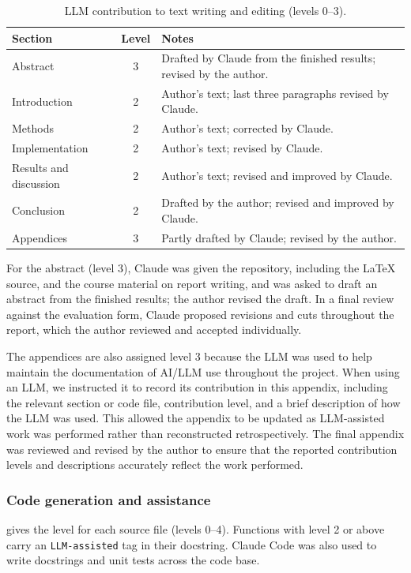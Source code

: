 \begin{table}[htbp]
    \centering
    \caption{LLM contribution to text writing and editing (levels 0--3).}
    \label{tab:llm-writing-contribution}
    {\footnotesize
    \begin{tabularx}{\columnwidth}{@{}lcX@{}}
        \toprule
        \textbf{Section} & \textbf{Level} & \textbf{Notes} \\
        \midrule
        Abstract & 3 & Drafted by Claude from the finished results; revised by the author. \\
        Introduction & 2 & Author's text; last three paragraphs revised by Claude. \\
        Methods & 2 & Author's text; corrected by Claude. \\
        Implementation & 2 & Author's text; revised by Claude. \\
        Results and discussion & 2 & Author's text; revised and improved by Claude. \\
        Conclusion & 2 & Drafted by the author; revised and improved by Claude. \\
        Appendices & 3 & Partly drafted by Claude; revised by the author. \\
        \bottomrule
    \end{tabularx}}
\end{table}

For the abstract (level 3), Claude was given the repository, including the
\LaTeX{} source, and the course material on report writing, and was asked to
draft an abstract from the finished results; the author revised the draft. In a
final review against the evaluation form, Claude proposed revisions and cuts
throughout the report, which the author reviewed and accepted individually.

The appendices are also assigned level 3 because the LLM was used to help
maintain the documentation of AI/LLM use throughout the project. When using an
LLM, we instructed it to record its contribution in this appendix, including
the relevant section or code file, contribution level, and a brief description
of how the LLM was used. This allowed the appendix to be updated as LLM-assisted
work was performed rather than reconstructed retrospectively. The final appendix
was reviewed and revised by the author to ensure that the reported contribution
levels and descriptions accurately reflect the work performed.

\subsubsection{Code generation and assistance}
 gives the level for each source file (levels 0--4).
Functions with level 2 or above carry an \texttt{LLM-assisted} tag in their
docstring. Claude Code was also used to write docstrings and unit tests across
the code base.


